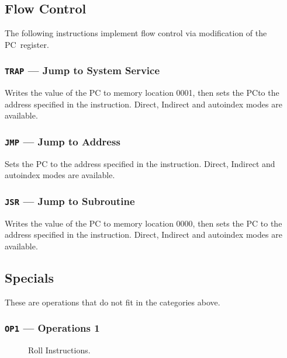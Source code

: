 \documentclass[11pt,a4paper,twocolumns]{article}
\newcommand\hex[1]{\textsf{#1}}
\newcommand\register[1]{\textsf{#1}}
\newcommand\PC{\register{PC}}
\begin{document}
\subsection{Flow Control}

The following instructions implement flow control via modification of the \PC\ register.

\subsubsection{{\tt TRAP} — Jump to System Service}
\label{sec-trap}

Writes the value of the \PC{} to memory location \hex{0001}, then sets
the \PC to the address specified in the instruction. Direct, Indirect
and autoindex modes are available.

\subsubsection{{\tt JMP} — Jump to Address}
\label{sec-jmp}

Sets the \PC{} to the address specified in the instruction. Direct,
Indirect and autoindex modes are available.

\subsubsection{{\tt JSR} — Jump to Subroutine}
\label{sec-jsr}

Writes the value of the \PC{} to memory location \hex{0000}, then sets
the \PC{} to the address specified in the instruction. Direct, Indirect
and autoindex modes are available.

\subsection{Specials}

These are operations that do not fit in the categories above.

\subsubsection{{\tt OP1} — Operations 1}
\label{sec-op1}

\begin{figure}[tb]
  \centering
  

  \caption{\label{fig-roll}Roll Instructions.}
\end{figure}
\end{document}
